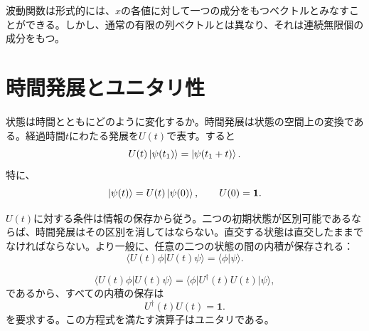 \begin{classroomqa}
\end{classroomqa}


波動関数は形式的には、\(x\)の各値に対して一つの成分をもつベクトルとみなすことができる。しかし、通常の有限の列ベクトルとは異なり、それは連続無限個の成分をもつ。

\begin{classroomqa}
\end{classroomqa}

\section{時間発展とユニタリ性}

状態は時間とともにどのように変化するか。時間発展は状態の空間上の変換である。経過時間\(t\)にわたる発展を\(U(t)\)で表す。すると
\begin{equation}
U(t)\left\lvert\psi(t_1)\right\rangle=\left\lvert\psi(t_1+t)\right\rangle.
\end{equation}
特に、
\begin{equation}
\left\lvert\psi(t)\right\rangle=U(t)\left\lvert\psi(0)\right\rangle,
\qquad
U(0)=\mathbf 1.
\end{equation}

\(U(t)\)に対する条件は情報の保存から従う。二つの初期状態が区別可能であるならば、時間発展はその区別を消してはならない。直交する状態は直交したままでなければならない。より一般に、任意の二つの状態の間の内積が保存される：
\begin{equation}
\langle U(t)\phi|U(t)\psi\rangle
=\langle\phi|\psi\rangle.
\end{equation}

\begin{equation}
\langle U(t)\phi|U(t)\psi\rangle
=\langle\phi|U^\dagger(t)U(t)|\psi\rangle,
\end{equation}
であるから、すべての内積の保存は
\begin{equation}
U^\dagger(t)U(t)=\mathbf 1.
\end{equation}
を要求する。この方程式を満たす演算子はユニタリである。

